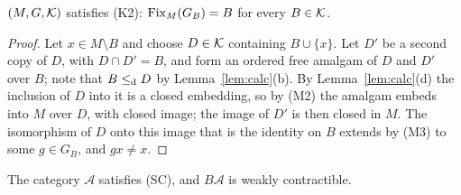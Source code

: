 \begin{lemma}\label{lem:K2delta}
$(M,G,\mathcal{K})$ satisfies \textup{(K2)}: $\operatorname{Fix}_M(G_B)=B$ for every $B\in\mathcal{K}$.
\end{lemma}

\begin{proof}
Let $x\in M\setminus B$ and choose $D\in\mathcal{K}$ containing $B\cup\{x\}$. Let $D'$ be a
second copy of $D$, with $D\cap D'=B$, and form an ordered free amalgam of $D$
and $D'$ over $B$; note that $B\leq_{\mathrm{d}} D$ by Lemma~\ref{lem:calc}(b). By
Lemma~\ref{lem:calc}(d) the inclusion of $D$ into it is a closed embedding, so
by (M2) the amalgam embeds into $M$ over $D$, with closed image; the image of
$D'$ is then closed in $M$. The isomorphism of $D$ onto this image that is the
identity on $B$ extends by (M3) to some $g\in G_B$, and $gx\ne x$.
\end{proof}

\begin{lemma}\label{lem:SCdelta}
The category $\mathcal A$ satisfies \textup{(SC)}, and $B\mathcal A$ is weakly
contractible.
\end{lemma}

